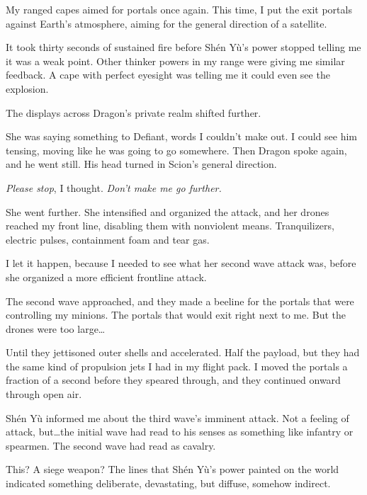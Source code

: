 My ranged capes aimed for portals once again.  This time, I put the exit portals against Earth's atmosphere, aiming for the general direction of a satellite.



It took thirty seconds of sustained fire before Sh\'{e}n Y\`{u}'s power stopped telling me it was a weak point.  Other thinker powers in my range were giving me similar feedback.  A cape with perfect eyesight was telling me it could even see the explosion.



The displays across Dragon's private realm shifted further.



She was saying something to Defiant, words I couldn't make out.  I could see him tensing, moving like he was going to go somewhere.  Then Dragon spoke again, and he went still.  His head turned in Scion's general direction.



\emph{Please stop}, I thought.  \emph{Don't make me go further.}



She went further.  She intensified and organized the attack, and her drones reached my front line, disabling them with nonviolent means.  Tranquilizers, electric pulses, containment foam and tear gas.



I let it happen, because I needed to see what her second wave attack was, before she organized a more efficient frontline attack.



The second wave approached, and they made a beeline for the portals that were controlling my minions.  The portals that would exit right next to me.  But the drones were too large\ldots



Until they jettisoned outer shells and accelerated.  Half the payload, but they had the same kind of propulsion jets I had in my flight pack.  I moved the portals a fraction of a second before they speared through, and they continued onward through open air.



Sh\'{e}n Y\`{u} informed me about the third wave's imminent attack.  Not a feeling of attack, but\ldots the initial wave had read to his senses as something like infantry or spearmen.  The second wave had read as cavalry.



This?  A siege weapon?  The lines that Sh\'{e}n Y\`{u}'s power painted on the world indicated something deliberate, devastating, but diffuse, somehow indirect.



